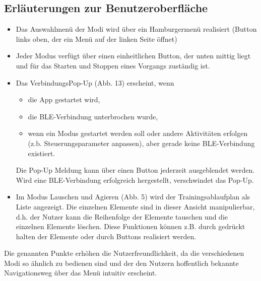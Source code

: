 \documentclass[a4paper,12pt]{article}
\begin{document}
\subsection{Erläuterungen zur Benutzeroberfläche}
\begin{itemize}
  \item Das Auswahlmenü der Modi wird über ein Hamburgermenü realisiert (Button links oben, der ein Menü auf der linken Seite öffnet)
  \item Jeder Modus verfügt über einen einheitlichen Button, der unten mittig liegt und für das Starten und Stoppen eines Vorgangs zuständig ist.
  \item {Das VerbindungsPop-Up (Abb. 13) erscheint, wenn 
  \begin{itemize}
    \item die App gestartet wird,
    \item die BLE-Verbindung unterbrochen wurde,
    \item wenn ein Modus gestartet werden soll oder andere Aktivitäten erfolgen (z.b. Steuerungsparameter anpassen), aber gerade keine BLE-Verbindung existiert.
  \end{itemize}
  Die Pop-Up Meldung kann über einen Button jederzeit ausgeblendet werden. 
  Wird eine BLE-Verbindung erfolgreich hergestellt, verschwindet das Pop-Up.
  }
  \item Im Modus Lauschen und Agieren (Abb. 5) wird der Trainingsablaufplan als Liste angezeigt. Die einzelnen Elemente sind in dieser Ansicht manipulierbar, d.h. der Nutzer kann die Reihenfolge der Elemente tauschen und die einzelnen Elemente löschen. Diese Funktionen können z.B. durch gedrückt halten der Elemente oder durch Buttons realisiert werden.
\end{itemize}
Die genannten Punkte erhöhen die Nutzerfreundlichkeit, da die verschiedenen Modi so ähnlich zu bedienen sind und der den Nutzern hoffentlich bekannte Navigationsweg über das Menü intuitiv erscheint.
\end{document}

